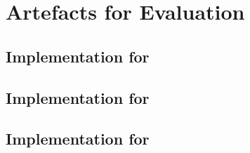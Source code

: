 \chapter{Artefacts for Evaluation}
\label{chapter:evalcode}

\section{Implementation for }
\label{section:evalcodegame}


\section{Implementation for }
\label{section:evalcodetwobuyer}

\section{Implementation for }
\label{section:evalcodeatm}